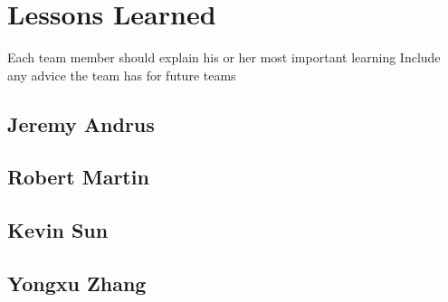 \chapter{Lessons Learned}
\label{chap:lessons}

Each team member should explain his or her most important learning
Include any advice the team has for future teams

\section{Jeremy Andrus}


\section{Robert Martin}


\section{Kevin Sun}


\section{Yongxu Zhang}


